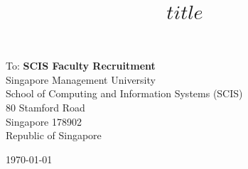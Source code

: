 \documentclass[11pt, a4paper]{article}
\title{$title$}
\begin{document}
\maketitle
\vspace{1em}

\begin{minipage}[t]{0.75\textwidth} 
  To: {\bf SCIS Faculty Recruitment} \\
  {
    Singapore Management University\\
    School of Computing and Information Systems (SCIS)\\
    80 Stamford Road\\
    Singapore 178902\\ 
    Republic of Singapore\\
  }
\end{minipage}\hfill\begin{minipage}[t]{0.25\textwidth}
  \begin{flushright}\today\end{flushright}
\end{minipage}

\vspace{2em}
\end{document}
